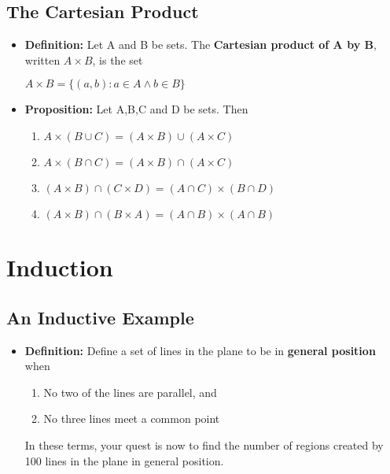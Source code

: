 \documentclass{report}
\begin{document}
	\section{The Cartesian Product}
		\begin{itemize}\addtolength{\leftskip}{2em}
			\item \textbf{Definition:} Let A and B be sets. The \textbf{Cartesian product of A by B}, written $A\times B$, is the set
			\begin{center}
			$A\times B=\{(a,b):a\in A\wedge b\in B \}$
			\end{center}
			\item \textbf{Proposition:} Let A,B,C and D be sets. Then
			\begin{enumerate}\addtolength{\leftskip}{4em}
				\item $A\times (B\cup C)=(A\times B)\cup (A\times C)$
				\item $A\times (B\cap C)=(A\times B)\cap (A\times C)$
				\item $(A\times B)\cap (C\times D)=(A\cap C)\times (B\cap D)$
				\item $(A\times B)\cap (B\times A)=(A\cap B)\times (A\cap B)$
			\end{enumerate}
		\end{itemize}
\chapter{Induction}
	\section{An Inductive Example}
		\begin{itemize}\addtolength{\leftskip}{2em}
			\item \textbf{Definition:} Define a set of lines in the plane to be in \textbf{general position} when 
			\begin{enumerate}\addtolength{\leftskip}{4em}
				\item No two of the lines are parallel, and
				\item No three lines meet a common point
			\end{enumerate} 
			In these terms, your quest is now to find the number of regions created by 100 lines in the plane in general position.
		\end{itemize}
\end{document}
